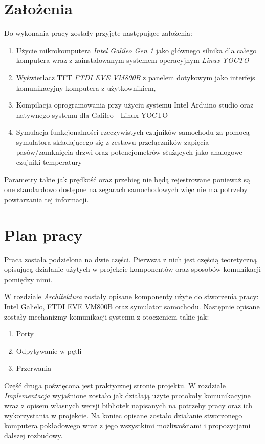 \documentclass{xmgr}
\begin{document}
\section{Założenia}
Do wykonania pracy zostały przyjęte następujące założenia:
\begin{enumerate}
	\item Użycie mikrokomputera \emph{Intel Galileo Gen 1} jako głównego silnika dla całego komputera wraz z zainstalowanym systemem operacyjnym \emph{Linux YOCTO}
	\item Wyświetlacz TFT \emph{FTDI EVE VM800B} z panelem dotykowym jako interfejs komunikacyjny komputera z użytkownikiem, 
	\item Kompilacja oprogramowania przy użyciu systemu Intel Arduino studio oraz natywnego systemu dla Galileo - Linux YOCTO
	\item Symulacja funkcjonalności rzeczywistych czujników samochodu za pomocą symulatora składającego się z zestawu przełączników zapięcia pasów/zamknięcia drzwi oraz potencjometrów służących jako analogowe czujniki temperatury
\end{enumerate}

Parametry takie jak prędkość oraz przebieg nie będą rejestrowane ponieważ są one standardowo dostępne na zegarach samochodowych więc nie ma potrzeby powtarzania tej informacji.

\section{Plan pracy}
Praca została podzielona na dwie części. Pierwsza z nich jest częścią teoretyczną opisującą działanie użytych w projekcie komponentów oraz sposobów komunikacji pomiędzy nimi. 

W rozdziale \emph{Architektura} zostały opisane komponenty użyte do stworzenia pracy: Intel Galielo, FTDI EVE VM800B oraz symulator samochodu. Następnie opisane zostały mechanizmy komunikacji systemu z otoczeniem takie jak:
\begin{enumerate}
  \item Porty
  \item Odpytywanie w pętli
  \item Przerwania
\end{enumerate}

Część druga poświęcona jest praktycznej stronie projektu. W rozdziale \emph{Implementacja} wyjaśnione zostało jak działają użyte protokoły komunikacyjne wraz z opisem własnych wersji bibliotek napisanych na potrzeby pracy oraz ich wykorzystania w projekcie. Na koniec opisane zostało działanie stworzonego komputera pokładowego wraz z jego wszystkimi możliwościami i propozycjami dalszej rozbudowy.
\end{document}
